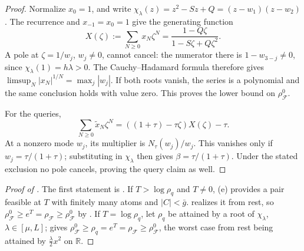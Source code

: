 \documentclass[11pt]{article}
\theoremstyle{definition}
\theoremstyle{remark}
\newcommand{\R}{\mathbb R}
\newcommand{\cF}{\mathcal F}
\newcommand{\rhoF}{\rho_{\cF}}
\newcommand{\rhoz}{\rho_{\cF}^{0}}
\begin{document}
\begin{proof}
Normalize \(x_0=1\), and write
\(\chi_\lambda(z)=z^2-Sz+Q=(z-w_1)(z-w_2)\).
The recurrence and \(x_{-1}=x_0=1\) give the generating function
\[
X(\zeta):=\sum_{N\ge0}x_N\zeta^N
=\frac{1-Q\zeta}{1-S\zeta+Q\zeta^2}.
\]
A pole at \(\zeta=1/w_j\), \(w_j\ne0\), cannot cancel:
the numerator there is \(1-w_{3-j}\ne0\), since
\(\chi_\lambda(1)=h\lambda>0\).  The Cauchy--Hadamard formula
therefore gives \(\limsup_N|x_N|^{1/N}=\max_j|w_j|\).
If both roots vanish, the series is a polynomial and the same conclusion
holds with value zero.  This proves the lower bound on \(\rhoz\).

For the queries,
\[
\sum_{N\ge0}\tilde x_N\zeta^N
=((1+\tau)-\tau\zeta)X(\zeta)-\tau.
\]
At a nonzero mode \(w_j\), its multiplier is
\(N_\tau(w_j)/w_j\).  This vanishes only if
\(w_j=\tau/(1+\tau)\); substituting in \(\chi_\lambda\) then gives
\(\beta=\tau/(1+\tau)\).  Under the stated exclusion no pole
cancels, proving the query claim as well.
\end{proof}

\begin{proof}[Proof of ]
The first statement is .  If \(T>\log\rho_q\) and \(T\ne0\), (e) provides a pair
feasible at \(T\) with finitely many atoms and \(|C|<\bar g\).   realizes
it from rest, so \(\rhoz\ge e^T=\rhoF\ge\rhoz\) by .  If \(T=\log\rho_q\), let \(\rho_q\) be
attained by a root of \(\chi_\lambda\), \(\lambda\in[\mu,L]\);  gives \(\rhoz\ge\rho_q=e^T=\rhoF\ge\rhoz\), the worst case
from rest being attained by \(\frac\lambda2x^2\) on \(\R\).
\end{proof}
\end{document}
